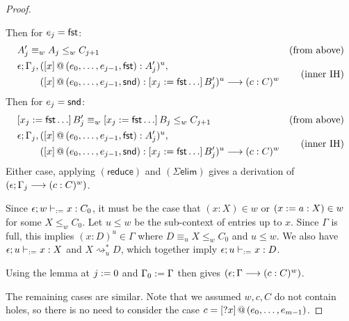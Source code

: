 \documentclass[twoside]{report}
\begin{document}
\begin{proof}
\begin{itemize}
\begin{itemize}
        Then for $e_j = \operatorname{\mathsf{fst}}$:
        $$
        \begin{aligned}
        & A_j' \equiv_w A_j \leq_w C_{j+1} & \text{(from above)} \\
        &
            \begin{aligned}
                \epsilon; \Gamma_j,\, & ({[x]}\,@\,({e_0, \ldots, e_{j-1}, \operatorname{\mathsf{fst}}}) : A_j')^u, \\
                & ({[x]}\,@\,({e_0, \ldots, e_{j-1}, \operatorname{\mathsf{snd}}}) : [{x_j}:={\operatorname{\mathsf{fst}} \ldots}]\,{B_j'})^u \longrightarrow (c : C)^w \\
            \end{aligned} & \text{(inner IH)} \\
        \end{aligned}
        $$
        Then for $e_j = \operatorname{\mathsf{snd}}$:
        $$
        \begin{aligned}
        & [{x_j}:={\operatorname{\mathsf{fst}} \ldots}]\,{B_j'} \equiv_w [{x_j}:={\operatorname{\mathsf{fst}} \ldots}]\,{B_j} \leq_w C_{j+1} & \text{(from above)} \\
        &
            \begin{aligned}
                \epsilon; \Gamma_j,\, & ({[x]}\,@\,({e_0, \ldots, e_{j-1}, \operatorname{\mathsf{fst}}}) : A_j')^u, \\
                & ({[x]}\,@\,({e_0, \ldots, e_{j-1}, \operatorname{\mathsf{snd}}}) : [{x_j}:={\operatorname{\mathsf{fst}} \ldots}]\,{B_j'})^u \longrightarrow (c : C)^w \\
            \end{aligned} & \text{(inner IH)} \\
        \end{aligned}
        $$
        Either case, applying $(\mathsf{reduce})$ and $(\Sigma\mathsf{elim})$ gives a derivation of $(\epsilon; \Gamma_j \longrightarrow (c : C)^w)$.
    \end{itemize}

    Since $\epsilon; w \vdash_{:=} x : C_0$, it must be the case that $(x : X) \in w$ or $(x := a : X) \in w$ for some $X \leq_w C_0$. Let $u \leq w$ be the sub-context of entries up to $x$. Since $\Gamma$ is full, this implies $(x : D)^u \in \Gamma$ where $D \equiv_u X \leq_w C_0$ and $u \leq w$. We also have $\epsilon; u \vdash_{:=} x : X$ and $X \rightsquigarrow_u^\ast D$, which together imply $\epsilon; u \vdash_{:=} x : D$.

    Using the lemma at $j := 0$ and $\Gamma_0 := \Gamma$ then gives $(\epsilon; \Gamma \longrightarrow (c : C)^w)$.
\end{itemize}

The remaining cases are similar. Note that we assumed $w,c,C$ do not contain holes, so there is no need to consider the case $c = {[?x]}\,@\,({e_0, \ldots, e_{m-1}})$.
\end{proof}
\end{document}
